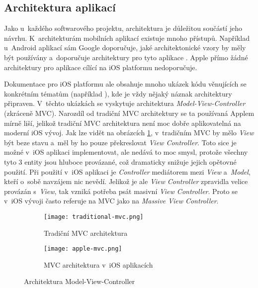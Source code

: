 \subsection{Architektura aplikací}\label{app-architecture}

Jako u~každého softwarového projektu, architektura je důležitou součástí jeho návrhu. K~architekturám mobilních aplikací existuje mnoho přístupů. Například u~Android aplikací sám Google doporučuje, jaké architektonické vzory by měly být používány a~doporučuje architektury pro tyto aplikace \cite{android-app-arch}. Apple přímo žádné architektury pro aplikace cílící na iOS platformu nedoporučuje. 

Dokumentace pro iOS platformu ale obsahuje mnoho ukázek kódu věnujících se konkrétním tématům (například \cite{swift-ui-tutorial-complex-interfaces}), kde je vždy nějaký náznak architektury připraven. V~těchto ukázkách se vyskytuje architektura \emph{Model-View-Controller} (zkráceně MVC). Narozdíl od tradiční MVC architektury se ta používaná Applem mírně liší, jelikož tradiční MVC architektura není moc dobře aplikovatelná na moderní iOS vývoj. Jak lze vidět na obrázcích \ref{fig:mvc}, v~tradičním MVC by mělo \emph{View} být beze stavu a~měl by ho pouze překreslovat \emph{View Controller}. Toto sice je možné v~iOS aplikaci implementovat, ale nedává to moc smysl, protože všechny tyto 3 entity jsou hluboce provázané, což dramaticky snižuje jejich opětovné použití. Při použití v~iOS aplikaci je \emph{Controller} mediátorem mezi \emph{View} a~\emph{Model}, kteří o~sobě navzájem nic nevědí. Jelikož je ale \emph{View Controller} zpravidla velice provázán s~\emph{View}, tak vzniká potřeba psát masivní \emph{View Controller}. Proto se v~iOS vývoji často referuje na MVC jako na \emph{Massive View Controller}.

\begin{figure}[h]
	\centering
	\begin{subfigure}[b]{0.35\textwidth}
		\centering
		\texttt{[image: traditional-mvc.png]}
		\caption{Tradiční MVC architektura}
	\end{subfigure}
	\hspace{1cm}
	\begin{subfigure}[b]{0.45\textwidth}
		\centering
		\texttt{[image: apple-mvc.png]}
		\caption{MVC architektura v~iOS aplikacích}
	\end{subfigure}
	\caption{Architektura Model-View-Controller \cite{ios-architecture-patterns}}
	\label{fig:mvc}
\end{figure}

